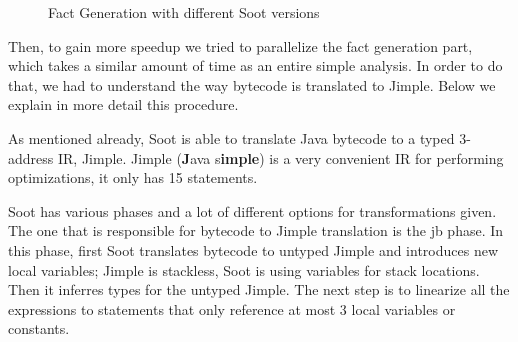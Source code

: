 \documentclass{dithesis}
\begin{document}
		\begin{figure}[H]
			\centering
{}
			\caption{Fact Generation with different Soot versions}
		\end{figure}

    	Then, to gain more speedup we tried to parallelize the fact generation part, which takes a similar amount of time as an entire simple analysis. In order to do that, we had to understand the way bytecode is translated to Jimple. Below we explain in more detail this procedure.

        As mentioned already, Soot is able to translate Java bytecode to a typed 3-address IR, Jimple. Jimple (\textbf{J}ava s\textbf{imple}) is a very convenient IR for performing optimizations, it only has 15 statements.

        Soot has various phases and a lot of different options for transformations given. The one that is responsible for bytecode to Jimple translation is the jb phase. In this phase, first Soot translates bytecode to untyped Jimple and introduces new local variables; Jimple is stackless, Soot is using variables for stack locations. Then it inferres types for the untyped Jimple. The next step is to linearize all the expressions to statements that only reference at most 3 local variables or constants.
\end{document}
